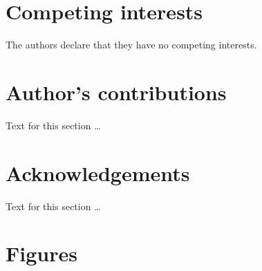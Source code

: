\documentclass{bmcart}
\begin{document}

\begin{backmatter}

\section*{Competing interests}
  The authors declare that they have no competing interests.

\section*{Author's contributions}
    Text for this section \ldots

\section*{Acknowledgements}
  Text for this section \ldots





\section*{Figures}


\end{backmatter}
\end{document}
